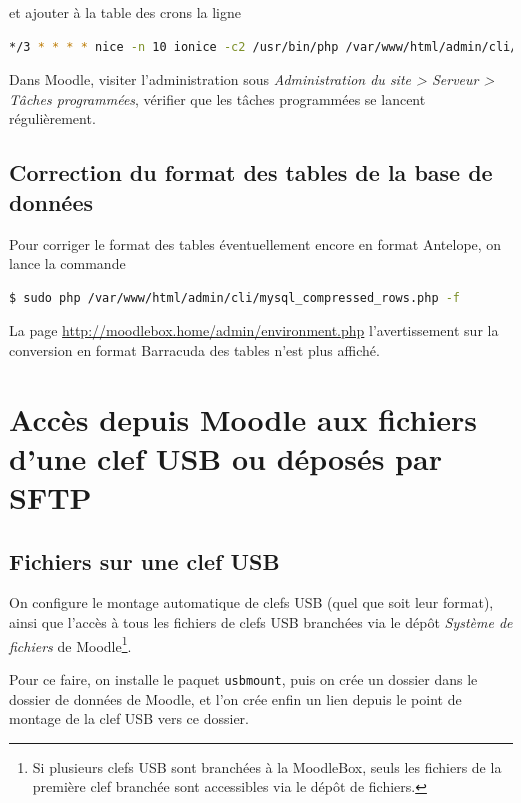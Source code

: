 \documentclass[11pt]{article}
\begin{document}
et ajouter à la table des crons la ligne
\begin{lstlisting}[language=bash]
*/3 * * * * nice -n 10 ionice -c2 /usr/bin/php /var/www/html/admin/cli/cron.php
\end{lstlisting}

\begin{verification}
Dans Moodle, visiter l'administration sous \emph{Administration du site > Serveur > Tâches programmées}, vérifier que les tâches programmées se lancent régulièrement.
\end{verification}

\subsection{Correction du format des tables de la base de données}

Pour corriger le format des tables éventuellement encore en format Antelope, on lance la commande

\begin{lstlisting}[language=bash]
$ sudo php /var/www/html/admin/cli/mysql_compressed_rows.php -f
\end{lstlisting}

\begin{verification}
La page \url{http://moodlebox.home/admin/environment.php} l'avertissement sur la conversion en format Barracuda des tables n'est plus affiché.
\end{verification}

\section{Accès depuis Moodle aux fichiers d'une clef USB ou déposés par SFTP}

\subsection{Fichiers sur une clef USB}

On configure le montage automatique de clefs USB (quel que soit leur format), ainsi que l'accès à tous les fichiers de clefs USB branchées via le dépôt \emph{Système de fichiers} de Moodle\footnote{Si plusieurs clefs USB sont branchées à la MoodleBox, seuls les fichiers de la première clef branchée sont accessibles via le dépôt de fichiers.}.

Pour ce faire, on installe le paquet \lstinline{usbmount}, puis on crée un dossier dans le dossier de données de Moodle, et l'on crée enfin un lien depuis le point de montage de la clef USB vers ce dossier.
\end{document}
